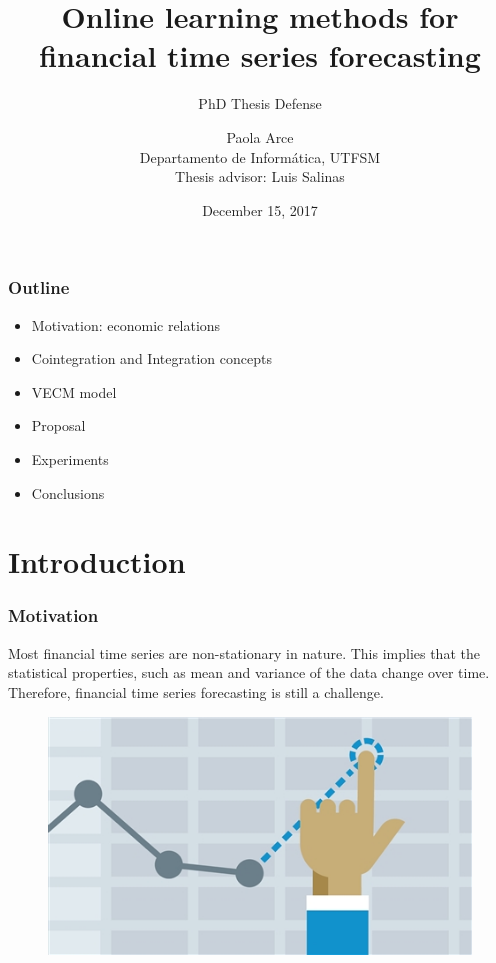 \documentclass{beamer}
\author[Paola Arce]{Paola Arce \\ Departamento de Inform\'atica, UTFSM \\ Thesis advisor: Luis Salinas}
\date{December 15, 2017}
\title[Thesis defense]{Online learning methods for financial time series forecasting}
\subtitle{PhD Thesis Defense}
\begin{document}
\begin{frame}[plain]
\titlepage
\end{frame}


\begin{frame}
\frametitle{Outline}
\begin{itemize}
\item Motivation: economic relations
\item Cointegration and Integration concepts
\item VECM model
\item Proposal
\item Experiments
\item Conclusions
\end{itemize}
\end{frame}

\section{Introduction}

\begin{frame}
\frametitle{Motivation}
Most financial time series are non-stationary in nature. This implies that the statistical properties, such as mean and variance of the data change over time. Therefore, financial time series forecasting is still a challenge.
\begin{figure}
\includegraphics[width=0.4\paperwidth]{img/forecast}
\end{figure}

\end{frame}
\end{document}
